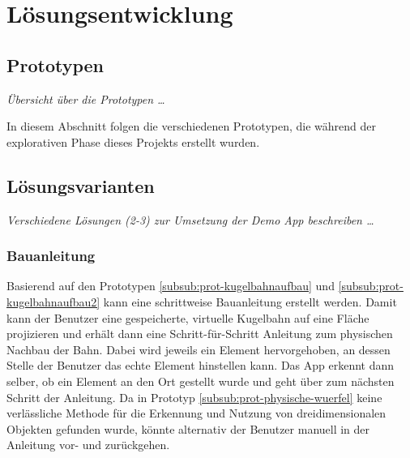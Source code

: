 \section{Lösungsentwicklung}

\subsection{Prototypen}
\textit{Übersicht über die Prototypen …} %

In diesem Abschnitt folgen die verschiedenen Prototypen, die während der explorativen Phase dieses Projekts erstellt wurden.









\subsection{Lösungsvarianten}
\textit{Verschiedene Lösungen (2-3) zur Umsetzung der Demo App beschreiben …}

\subsubsection{Bauanleitung}

Basierend auf den Prototypen \ref{subsub:prot-kugelbahnaufbau} und \ref{subsub:prot-kugelbahnaufbau2} kann eine schrittweise Bauanleitung erstellt werden.
Damit kann der Benutzer eine gespeicherte, virtuelle Kugelbahn auf eine Fläche projizieren und erhält dann eine Schritt-für-Schritt Anleitung zum physischen Nachbau der Bahn.
Dabei wird jeweils ein Element hervorgehoben, an dessen Stelle der Benutzer das echte Element hinstellen kann.
Das App erkennt dann selber, ob ein Element an den Ort gestellt wurde und geht über zum nächsten Schritt der Anleitung.
Da in Prototyp \ref{subsub:prot-physische-wuerfel} keine verlässliche Methode für die Erkennung und Nutzung von dreidimensionalen Objekten gefunden wurde, könnte alternativ der Benutzer manuell in der Anleitung vor- und zurückgehen.


